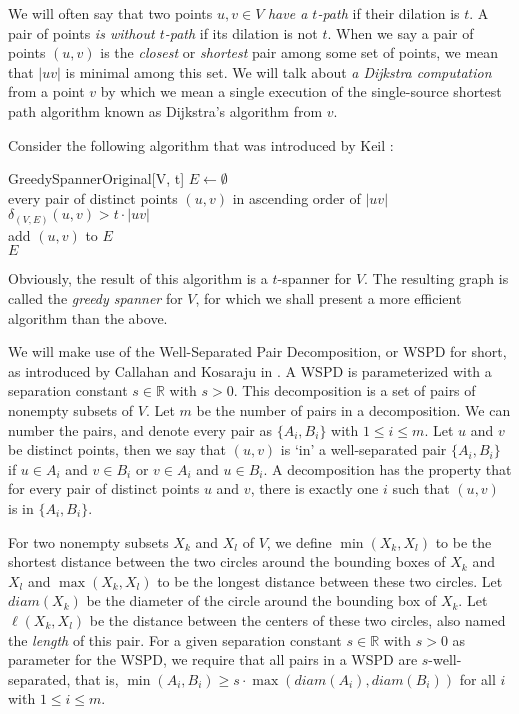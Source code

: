 \documentclass[runningheads,envcountsame,oribibl,orivec]{llncs}
\newcommand{\Reals}{\mathbb{R}}
\begin{document}
We will often say that two points $u, v \in V$ \emph{have a $t$-path} if their dilation is $t$. A pair of points \emph{is without $t$-path} if its dilation is not $t$. When we say a pair of points $(u, v)$ is the \emph{closest} or \emph{shortest} pair among some set of points, we mean that $|uv|$ is minimal among this set. We will talk about \emph{a Dijkstra computation} from a point $v$ by which we mean a single execution of the single-source shortest path algorithm known as Dijkstra's algorithm from $v$.

Consider the following algorithm that was introduced by Keil \cite{Keil:1988:ACE:61764.61787}:

\pagebreak

\begin{algorithm}{GreedySpannerOriginal}[V, t]{\label{algo:greedyorig}}
  $E \gets \emptyset$
  \\ \qfor every pair of distinct points $(u, v)$ in ascending order of $|uv|$
  \\ \qdo \qif $\delta_{(V, E)}(u, v) > t \cdot |uv|$
       \\ \qthen add $(u, v)$ to $E$
          \qendif
     \qendfor
  \\ \qreturn $E$
\end{algorithm}

Obviously, the result of this algorithm is a $t$-spanner for $V$. The resulting graph is called the \emph{greedy spanner} for $V$, for which we shall present a more efficient algorithm than the above.

We will make use of the Well-Separated Pair Decomposition, or WSPD for short, as introduced by Callahan and Kosaraju in \cite{Callahan95dealingwith,Callahan:1995:DMP:200836.200853}. A WSPD is parameterized with a separation constant $s \in \Reals$ with $s > 0$. This decomposition is a set of pairs of nonempty subsets of $V$. Let $m$ be the number of pairs in a decomposition. We can number the pairs, and denote every pair as $\{ A_i, B_i \}$ with $1 \leq i \leq m$. Let $u$ and $v$ be distinct points, then we say that $(u, v)$ is `in' a well-separated pair $\{ A_i, B_i \}$ if $u \in A_i$ and $v \in B_i$ or $v \in A_i$ and $u \in B_i$. A decomposition has the property that for every pair of distinct points $u$ and $v$, there is exactly one $i$ such that $(u,v)$ is in $\{ A_i, B_i \}$.

For two nonempty subsets $X_k$ and $X_l$ of $V$, we define $\min(X_k, X_l)$ to be the shortest distance between the two circles around the bounding boxes of $X_k$ and $X_l$ and $\max(X_k, X_l)$ to be the longest distance between these two circles. Let $diam(X_k)$ be the diameter of the circle around the bounding box of $X_k$. Let $\ell(X_k, X_l)$ be the distance between the centers of these two circles, also named the \emph{length} of this pair. For a given separation constant $s \in \Reals$ with $s>0$ as parameter for the WSPD, we require that all pairs in a WSPD are $s$-well-separated, that is, $\min(A_i, B_i) \geq s \cdot \max(diam(A_i), diam(B_i))$ for all $i$ with $1 \leq i \leq m$.
\end{document}
